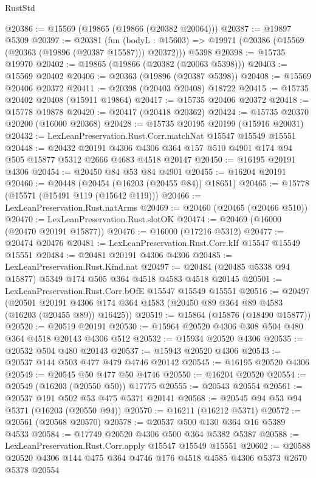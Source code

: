 \begin{lexlean}{RustStd}
\begin{coremodule}
@20386 := @15569 (@19865 (@19866 (@20382 @20064)))
@20387 := @19897 @5309
@20397 := @20381
    (fun (bodyL : @15603) => @19971 (@20386 (@15569 (@20363 (@19896 (@20387 @15587))) @20372)))
    @5398
@20398 := @15735 @19970
@20402 := @19865 (@19866 (@20382 (@20063 @5398)))
@20403 := @15569 @20402
@20406 := @20363 (@19896 (@20387 @5398))
@20408 := @15569 @20406 @20372
@20411 := @20398 (@20403 @20408) @18722
@20415 := @15735 @20402 @20408 (@15911 @19864)
@20417 := @15735 @20406 @20372
@20418 := @15778 @19878
@20420 := @20417 (@20418 @20362)
@20424 := @15735 @20370 @20200 (@16000 @20368)
@20428 := @15735 @20195 @20199 (@15916 @20031)
@20432 := LexLeanPreservation.Rust.Corr.matchNat @15547 @15549 @15551
@20448 := @20432
    @20191
    @4306
    @4306
    @364
    @157
    @510
    @4901
    @174
    @94
    @505
    @15877
    @5312
    @2666
    @4683
    @4518
    @20147
@20450 := @16195 @20191 @4306
@20454 := @20450 @84 @53 @84 @4901
@20455 := @16204 @20191
@20460 := @20448 (@20454 (@16203 (@20455 @84)) @18651)
@20465 := @15778 (@15571 (@15491 @119 (@15642 @119)))
@20466 := LexLeanPreservation.Rust.natArms
@20469 := @20460 (@20465 (@20466 @510))
@20470 := LexLeanPreservation.Rust.slotOK
@20474 := @20469 (@16000 (@20470 @20191 @15877))
@20476 := @16000 (@17216 @5312)
@20477 := @20474 @20476
@20481 := LexLeanPreservation.Rust.Corr.kIf @15547 @15549 @15551
@20484 := @20481 @20191 @4306 @4306
@20485 := LexLeanPreservation.Rust.Kind.nat
@20497 := @20484 (@20485 @5338 @94 @15877) @5349 @174 @505 @364 @4518 @4583 @4518 @20145
@20501 := LexLeanPreservation.Rust.Corr.bOfE @15547 @15549 @15551
@20516 := @20497
    (@20501 @20191 @4306 @174 @364 @4583 (@20450 @89 @364 @89 @4583 (@16203 (@20455 @89)) @16425))
@20519 := @15864 (@15876 (@18490 @15877))
@20520 := @20519 @20191
@20530 := @15964 @20520 @4306 @308 @504 @480 @364 @4518 @20143 @4306 @512
@20532 := @15934 @20520 @4306
@20535 := @20532 @504 @480 @20143
@20537 := @15943 @20520 @4306
@20543 := @20537 @144 @503 @477 @479 @4746 @20142
@20545 := @16195 @20520 @4306
@20549 := @20545 @50 @477 @50 @4746
@20550 := @16204 @20520
@20554 := @20549 (@16203 (@20550 @50)) @17775
@20555 := @20543 @20554
@20561 := @20537 @191 @502 @53 @475 @5371 @20141
@20568 := @20545 @94 @53 @94 @5371 (@16203 (@20550 @94))
@20570 := @16211 (@16212 @5371)
@20572 := @20561 (@20568 @20570)
@20578 := @20537 @500 @130 @364 @16 @5389 @4533
@20584 := @17749 @20520 @4306 @500 @364 @5382 @5387
@20588 := LexLeanPreservation.Rust.Corr.apply @15547 @15549 @15551
@20602 := @20588 @20520 @4306 @144 @475 @364 @4746 @176 @4518 @4585 @4306 @5373 @2670 @5378 @20554

\end{coremodule}
\end{lexlean}
